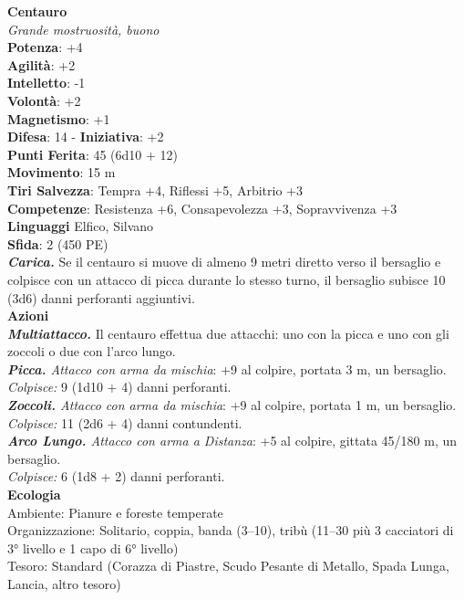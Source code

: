 \begin{multicols}{2}
\medskip\textbf{Centauro}\\
\emph{Grande mostruosità, buono}\\
\textbf{Potenza}: +4\\
\textbf{Agilità}: +2\\
\textbf{Intelletto}: -1\\
\textbf{Volontà}: +2\\
\textbf{Magnetismo}: +1\\
\textbf{Difesa}: 14 - \textbf{Iniziativa}: +2\\
\textbf{Punti Ferita}: 45 (6d10 + 12)\\
\textbf{Movimento}: 15 m\\
\textbf{Tiri Salvezza}: Tempra +4, Riflessi +5, Arbitrio +3\\
\textbf{Competenze}: Resistenza +6, Consapevolezza +3, Sopravvivenza +3\\
\textbf{Linguaggi} Elfico, Silvano\\
\textbf{Sfida}: 2 (450 PE)\smallskip\\
\emph{\textbf{Carica.}} Se il centauro si muove di almeno 9 metri diretto verso il bersaglio e colpisce con un attacco di picca durante lo stesso turno, il bersaglio subisce 10 (3d6) danni perforanti aggiuntivi. \\
\smallskip\textbf{Azioni}\\
\emph{\textbf{Multiattacco.}} Il centauro effettua due attacchi: uno con la picca e uno con gli zoccoli o due con l'arco lungo.\\
\emph{\textbf{Picca.} Attacco con arma da mischia}: +9 al colpire, portata 3 m, un bersaglio.\\
\emph{Colpisce:} 9 (1d10 + 4) danni perforanti.\\
\emph{\textbf{Zoccoli.} Attacco con arma da mischia}: +9 al colpire, portata 1 m, un bersaglio.\\
\emph{Colpisce:} 11 (2d6 + 4) danni contundenti.\\
\emph{\textbf{Arco Lungo.} Attacco con arma a Distanza}: +5 al colpire, gittata 45/180 m, un bersaglio.\\
\emph{Colpisce:} 6 (1d8 + 2) danni perforanti.\\
\textbf{Ecologia}\\
Ambiente: Pianure e foreste temperate\\
Organizzazione: Solitario, coppia, banda (3–10), tribù (11–30 più 3 cacciatori di 3° livello e 1 capo di 6° livello)\\
Tesoro: Standard (Corazza di Piastre, Scudo Pesante di Metallo, Spada Lunga, Lancia, altro tesoro)\\

\end{multicols}
